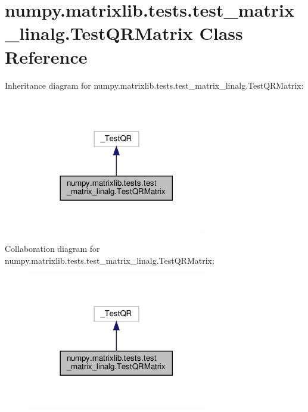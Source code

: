 \hypertarget{classnumpy_1_1matrixlib_1_1tests_1_1test__matrix__linalg_1_1TestQRMatrix}{}\section{numpy.\+matrixlib.\+tests.\+test\+\_\+matrix\+\_\+linalg.\+Test\+Q\+R\+Matrix Class Reference}
\label{classnumpy_1_1matrixlib_1_1tests_1_1test__matrix__linalg_1_1TestQRMatrix}


Inheritance diagram for numpy.\+matrixlib.\+tests.\+test\+\_\+matrix\+\_\+linalg.\+Test\+Q\+R\+Matrix\+:
\nopagebreak
\begin{figure}[H]
\begin{center}
\leavevmode
\includegraphics[width=221pt]{classnumpy_1_1matrixlib_1_1tests_1_1test__matrix__linalg_1_1TestQRMatrix__inherit__graph}
\end{center}
\end{figure}


Collaboration diagram for numpy.\+matrixlib.\+tests.\+test\+\_\+matrix\+\_\+linalg.\+Test\+Q\+R\+Matrix\+:
\nopagebreak
\begin{figure}[H]
\begin{center}
\leavevmode
\includegraphics[width=221pt]{classnumpy_1_1matrixlib_1_1tests_1_1test__matrix__linalg_1_1TestQRMatrix__coll__graph}
\end{center}
\end{figure}

